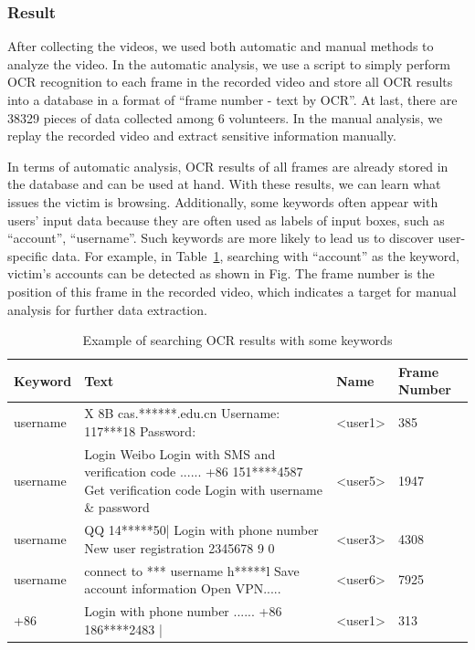 \subsubsection{Result}

After collecting the videos, we used both automatic and manual methods to analyze the video. In the automatic analysis, we use a script to simply perform OCR recognition to each frame in the recorded video and store all OCR results into a database in a format of ``frame number - text by OCR''. At last, there are 38329 pieces of data collected among 6 volunteers. In the manual analysis, we replay the recorded video and extract sensitive information manually.

In terms of automatic analysis, OCR results of all frames are already stored in the database and can be used at hand. With these results, we can learn what issues the victim is browsing. Additionally, some keywords often appear with users' input data because they are often used as labels of input boxes, such as ``account'', ``username''. Such keywords are more likely to lead us to discover user-specific data. For example, in Table~\ref{tab:ocr_keyword_example}, searching with ``account'' as the keyword, victim's accounts can be detected as shown in Fig. The frame number is the position of this frame in the recorded video, which indicates a target for manual analysis for further data extraction.

\begin{table}[hbtp]
	\centering
	\begin{tabular}{|l|l|l|l|}
		\hline
		Keyword  & Text                                                                                                                          & Name                           & Frame Number \\ \hline
		username & X 8B cas.******.edu.cn Username: 117***18 Password:                                                                           & \textless{}user1\textgreater{} & 385          \\ \hline
		username & Login Weibo Login with SMS and verification code ...... +86 151****4587 Get verification code Login with username \& password & \textless{}user5\textgreater{} & 1947         \\ \hline
		username & QQ 14*****50| Login with phone number New user registration 2345678 9 0                                                       & \textless{}user3\textgreater{} & 4308         \\ \hline
		username & connect to *** username h*****l Save account information Open VPN.....                                                        & \textless{}user6\textgreater{} & 7925         \\ \hline
		+86      & Login with phone number ...... +86 186****2483 |                                                                              & \textless{}user1\textgreater{} & 313          \\ \hline
	\end{tabular}
	\caption{Example of searching OCR results with some keywords}
	\label{tab:ocr_keyword_example}
\end{table}


